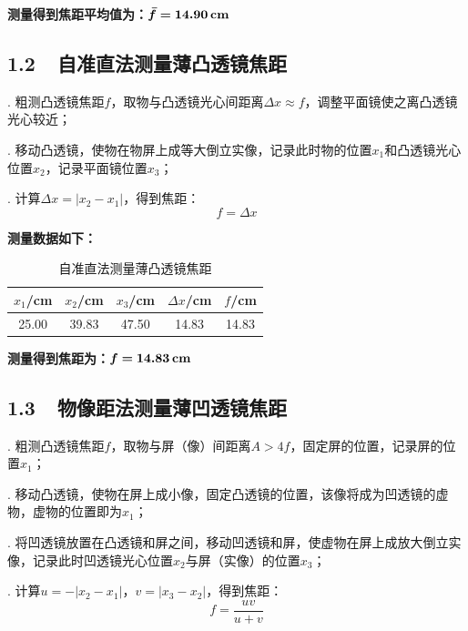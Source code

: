 \documentclass{ctexbook}
\begin{document}
	\noindent \textbf{测量得到焦距平均值为：}$\bm{\bar{f} =} \textbf{14.90\,cm}$

    \bigskip
    \subsection*{ 1.2\ \ 自准直法测量薄凸透镜焦距}

    . 粗测凸透镜焦距$f$，取物与凸透镜光心间距离$\Delta x \approx f$，调整平面镜使之离凸透镜光心较近；

    . 移动凸透镜，使物在物屏上成等大倒立实像，记录此时物的位置$x_1$和凸透镜光心位置$x_2$，记录平面镜位置$x_3$；

    . 计算$\Delta x = |x_2 - x_1|$，得到焦距：
    \[f = \Delta x\]

    \noindent \textbf{测量数据如下：}
    \begin{table}[ht!]
        \begin{center}
            \begin{tabular}{|c|c|c|c|c|}
                \hline
                $x_1$/cm & $x_2$/cm & $x_3$/cm & $\Delta x$/cm & $f$/cm \\
                \hline
                25.00 & 39.83 & 47.50 & 14.83 & 14.83 \\
                \hline
            \end{tabular}
            \caption{自准直法测量薄凸透镜焦距}
        \end{center}
    \end{table}

    \noindent \textbf{测量得到焦距为：}$\bm{f =} \textbf{14.83\,cm}$

    \bigskip
    \subsection*{ 1.3\ \ 物像距法测量薄凹透镜焦距}

    . 粗测凸透镜焦距$f$，取物与屏（像）间距离$A>4f$，固定屏的位置，记录屏的位置$x_1$；

    . 移动凸透镜，使物在屏上成小像，固定凸透镜的位置，该像将成为凹透镜的虚物，虚物的位置即为$x_1$；

    . 将凹透镜放置在凸透镜和屏之间，移动凹透镜和屏，使虚物在屏上成放大倒立实像，记录此时凹透镜光心位置$x_2$与屏（实像）的位置$x_3$；

    . 计算$u = -|x_2 - x_1|$，$v = |x_3-x_2|$，得到焦距：
    \[f = \frac{uv}{u+v}\]
\end{document}
